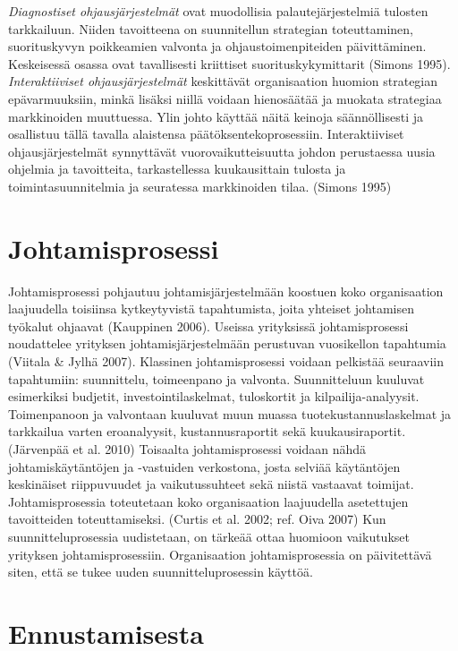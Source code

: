 \documentclass[12pt,a4paper,oneside,pdftex]{report}
\begin{document}
\emph{Diagnostiset ohjausjärjestelmät} ovat muodollisia palautejärjestelmiä tulosten tarkkailuun. Niiden tavoitteena on suunnitellun strategian toteuttaminen, suorituskyvyn poikkeamien valvonta ja ohjaustoimenpiteiden päivittäminen. Keskeisessä osassa ovat tavallisesti kriittiset suorituskykymittarit (Simons 1995). \emph{Interaktiiviset ohjausjärjestelmät} keskittävät organisaation huomion strategian epävarmuuksiin, minkä lisäksi niillä voidaan hienosäätää ja muokata strategiaa markkinoiden muuttuessa. Ylin johto käyttää näitä keinoja säännöllisesti ja osallistuu tällä tavalla alaistensa päätöksentekoprosessiin. Interaktiiviset ohjausjärjestelmät synnyttävät vuorovaikutteisuutta johdon perustaessa uusia ohjelmia ja tavoitteita, tarkastellessa kuukausittain tulosta ja toimintasuunnitelmia ja seuratessa markkinoiden tilaa. (Simons 1995)

\section{Johtamisprosessi}

Johtamisprosessi pohjautuu johtamisjärjestelmään koostuen koko organisaation laajuudella toisiinsa kytkeytyvistä tapahtumista, joita yhteiset johtamisen työkalut ohjaavat (Kauppinen 2006). Useissa yrityksissä johtamisprosessi noudattelee yrityksen johtamisjärjestelmään perustuvan vuosikellon tapahtumia (Viitala & Jylhä 2007). Klassinen johtamisprosessi voidaan pelkistää seuraaviin tapahtumiin: suunnittelu, toimeenpano ja valvonta. Suunnitteluun kuuluvat esimerkiksi budjetit, investointilaskelmat, tuloskortit ja kilpailija-analyysit. Toimenpanoon ja valvontaan kuuluvat muun muassa tuotekustannuslaskelmat ja tarkkailua varten eroanalyysit, kustannusraportit sekä kuukausiraportit. (Järvenpää et al. 2010) Toisaalta johtamisprosessi voidaan nähdä johtamiskäytäntöjen ja -vastuiden verkostona, josta selviää käytäntöjen keskinäiset riippuvuudet ja vaikutussuhteet sekä niistä vastaavat toimijat. Johtamisprosessia toteutetaan koko organisaation laajuudella asetettujen tavoitteiden toteuttamiseksi. (Curtis et al. 2002; ref. Oiva 2007) Kun suunnitteluprosessia uudistetaan, on tärkeää ottaa huomioon vaikutukset yrityksen johtamisprosessiin. Organisaation johtamisprosessia on päivitettävä siten, että se tukee uuden suunnitteluprosessin käyttöä.

\section{Ennustamisesta}
\end{document}
